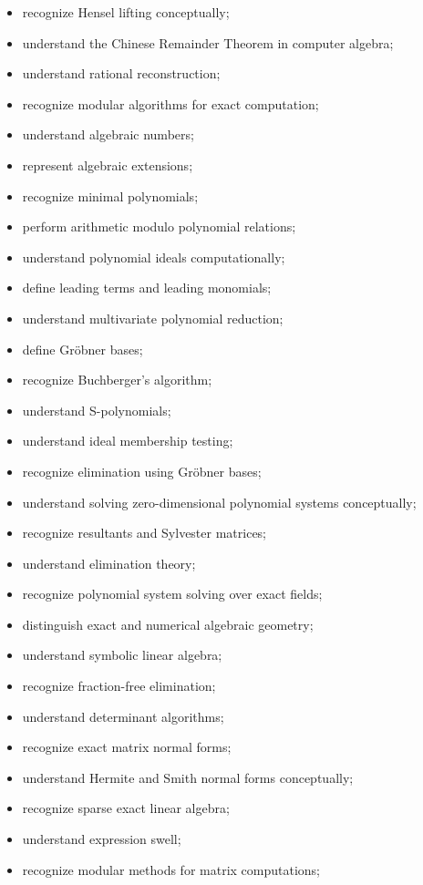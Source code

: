 {\begin{itemize}
    \item recognize Hensel lifting conceptually;
    \item understand the Chinese Remainder Theorem in computer algebra;
    \item understand rational reconstruction;
    \item recognize modular algorithms for exact computation;
    \item understand algebraic numbers;
    \item represent algebraic extensions;
    \item recognize minimal polynomials;
    \item perform arithmetic modulo polynomial relations;
    \item understand polynomial ideals computationally;
    \item define leading terms and leading monomials;
    \item understand multivariate polynomial reduction;
    \item define Gröbner bases;
    \item recognize Buchberger's algorithm;
    \item understand S-polynomials;
    \item understand ideal membership testing;
    \item recognize elimination using Gröbner bases;
    \item understand solving zero-dimensional polynomial systems
          conceptually;
    \item recognize resultants and Sylvester matrices;
    \item understand elimination theory;
    \item recognize polynomial system solving over exact fields;
    \item distinguish exact and numerical algebraic geometry;
    \item understand symbolic linear algebra;
    \item recognize fraction-free elimination;
    \item understand determinant algorithms;
    \item recognize exact matrix normal forms;
    \item understand Hermite and Smith normal forms conceptually;
    \item recognize sparse exact linear algebra;
    \item understand expression swell;
    \item recognize modular methods for matrix computations;

\end{itemize}}
